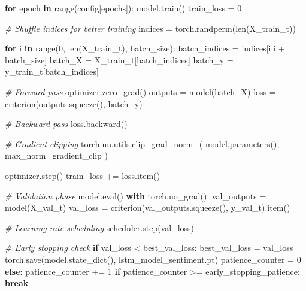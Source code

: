 \documentclass[
]{article}
\newenvironment{Shaded}{}{}
\newcommand{\BuiltInTok}[1]{\textcolor[rgb]{0.00,0.50,0.00}{#1}}
\newcommand{\CommentTok}[1]{\textcolor[rgb]{0.38,0.63,0.69}{\textit{#1}}}
\newcommand{\ControlFlowTok}[1]{\textcolor[rgb]{0.00,0.44,0.13}{\textbf{#1}}}
\newcommand{\DecValTok}[1]{\textcolor[rgb]{0.25,0.63,0.44}{#1}}
\newcommand{\KeywordTok}[1]{\textcolor[rgb]{0.00,0.44,0.13}{\textbf{#1}}}
\newcommand{\NormalTok}[1]{#1}
\newcommand{\OperatorTok}[1]{\textcolor[rgb]{0.40,0.40,0.40}{#1}}
\newcommand{\StringTok}[1]{\textcolor[rgb]{0.25,0.44,0.63}{#1}}
\begin{document}
\begin{Shaded}
\begin{Highlighting}[]
\ControlFlowTok{for}\NormalTok{ epoch }\KeywordTok{in} \BuiltInTok{range}\NormalTok{(config[}\StringTok{\textquotesingle{}epochs\textquotesingle{}}\NormalTok{]):}
\NormalTok{    model.train()}
\NormalTok{    train\_loss }\OperatorTok{=} \DecValTok{0}
    
    \CommentTok{\# Shuffle indices for better training}
\NormalTok{    indices }\OperatorTok{=}\NormalTok{ torch.randperm(}\BuiltInTok{len}\NormalTok{(X\_train\_t))}
    
    \ControlFlowTok{for}\NormalTok{ i }\KeywordTok{in} \BuiltInTok{range}\NormalTok{(}\DecValTok{0}\NormalTok{, }\BuiltInTok{len}\NormalTok{(X\_train\_t), batch\_size):}
\NormalTok{        batch\_indices }\OperatorTok{=}\NormalTok{ indices[i:i }\OperatorTok{+}\NormalTok{ batch\_size]}
\NormalTok{        batch\_X }\OperatorTok{=}\NormalTok{ X\_train\_t[batch\_indices]}
\NormalTok{        batch\_y }\OperatorTok{=}\NormalTok{ y\_train\_t[batch\_indices]}
        
        \CommentTok{\# Forward pass}
\NormalTok{        optimizer.zero\_grad()}
\NormalTok{        outputs }\OperatorTok{=}\NormalTok{ model(batch\_X)}
\NormalTok{        loss }\OperatorTok{=}\NormalTok{ criterion(outputs.squeeze(), batch\_y)}
        
        \CommentTok{\# Backward pass}
\NormalTok{        loss.backward()}
        
        \CommentTok{\# Gradient clipping}
\NormalTok{        torch.nn.utils.clip\_grad\_norm\_(}
\NormalTok{            model.parameters(),}
\NormalTok{            max\_norm}\OperatorTok{=}\NormalTok{gradient\_clip}
\NormalTok{        )}
        
\NormalTok{        optimizer.step()}
\NormalTok{        train\_loss }\OperatorTok{+=}\NormalTok{ loss.item()}
    
    \CommentTok{\# Validation phase}
\NormalTok{    model.}\BuiltInTok{eval}\NormalTok{()}
    \ControlFlowTok{with}\NormalTok{ torch.no\_grad():}
\NormalTok{        val\_outputs }\OperatorTok{=}\NormalTok{ model(X\_val\_t)}
\NormalTok{        val\_loss }\OperatorTok{=}\NormalTok{ criterion(val\_outputs.squeeze(), y\_val\_t).item()}
    
    \CommentTok{\# Learning rate scheduling}
\NormalTok{    scheduler.step(val\_loss)}
    
    \CommentTok{\# Early stopping check}
    \ControlFlowTok{if}\NormalTok{ val\_loss }\OperatorTok{\textless{}}\NormalTok{ best\_val\_loss:}
\NormalTok{        best\_val\_loss }\OperatorTok{=}\NormalTok{ val\_loss}
\NormalTok{        torch.save(model.state\_dict(), }\StringTok{\textquotesingle{}lstm\_model\_sentiment.pt\textquotesingle{}}\NormalTok{)}
\NormalTok{        patience\_counter }\OperatorTok{=} \DecValTok{0}
    \ControlFlowTok{else}\NormalTok{:}
\NormalTok{        patience\_counter }\OperatorTok{+=} \DecValTok{1}
        \ControlFlowTok{if}\NormalTok{ patience\_counter }\OperatorTok{\textgreater{}=}\NormalTok{ early\_stopping\_patience:}
            \ControlFlowTok{break}
\end{Highlighting}
\end{Shaded}
\end{document}
